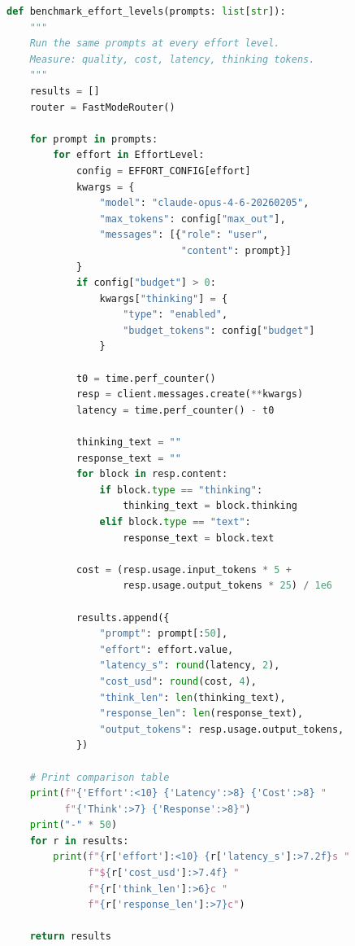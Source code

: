\documentclass[11pt,a4paper]{article}
\begin{document}
\begin{lstlisting}[language=Python, caption={Benchmark: Compare All Effort Levels}]
def benchmark_effort_levels(prompts: list[str]):
    """
    Run the same prompts at every effort level.
    Measure: quality, cost, latency, thinking tokens.
    """
    results = []
    router = FastModeRouter()
    
    for prompt in prompts:
        for effort in EffortLevel:
            config = EFFORT_CONFIG[effort]
            kwargs = {
                "model": "claude-opus-4-6-20260205",
                "max_tokens": config["max_out"],
                "messages": [{"role": "user", 
                              "content": prompt}]
            }
            if config["budget"] > 0:
                kwargs["thinking"] = {
                    "type": "enabled",
                    "budget_tokens": config["budget"]
                }
            
            t0 = time.perf_counter()
            resp = client.messages.create(**kwargs)
            latency = time.perf_counter() - t0
            
            thinking_text = ""
            response_text = ""
            for block in resp.content:
                if block.type == "thinking":
                    thinking_text = block.thinking
                elif block.type == "text":
                    response_text = block.text
            
            cost = (resp.usage.input_tokens * 5 +
                    resp.usage.output_tokens * 25) / 1e6
            
            results.append({
                "prompt": prompt[:50],
                "effort": effort.value,
                "latency_s": round(latency, 2),
                "cost_usd": round(cost, 4),
                "think_len": len(thinking_text),
                "response_len": len(response_text),
                "output_tokens": resp.usage.output_tokens,
            })
    
    # Print comparison table
    print(f"{'Effort':<10} {'Latency':>8} {'Cost':>8} "
          f"{'Think':>7} {'Response':>8}")
    print("-" * 50)
    for r in results:
        print(f"{r['effort']:<10} {r['latency_s']:>7.2f}s "
              f"${r['cost_usd']:>7.4f} "
              f"{r['think_len']:>6}c "
              f"{r['response_len']:>7}c")
    
    return results
\end{lstlisting}

\end{document}
